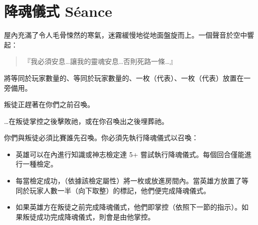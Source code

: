 
\chapter{降魂儀式 Séance}

\begin{HauntStory}
	屋內充滿了令人毛骨悚然的寒氣，迷霧緩慢地從地面盤旋而上。一個聲音於空中響起：
	\begin{quote}
		『我必須安息…讓我的靈魂安息…否則死路一條…』
	\end{quote}
\end{HauntStory}

將等同於玩家數量的、等同於玩家數量的、一枚（代表）、一枚（代表）放置在一旁備用。

叛徒正趕著在你們之前召喚。

…在叛徒掌控之後擊敗祂，或在你召喚出之後埋葬祂。

你們與叛徒必須比賽誰先召喚。你必須先執行降魂儀式以召喚：
\begin{itemize}
	\item 英雄可以在內進行知識或神志檢定達 5+ 嘗試執行降魂儀式。每個回合僅能進行一種檢定。
	\item 每當檢定成功，（依據該檢定屬性）將一枚或放進房間內。當英雄方放置了等同於玩家人數一半（向下取整）的標記，他們便完成降魂儀式。
	\item 如果英雄方在叛徒之前完成降魂儀式，他們即掌控（依照下一節的指示）。如果叛徒成功完成降魂儀式，則會是由他掌控。
\end{itemize}

\vfill\null\pagebreak

